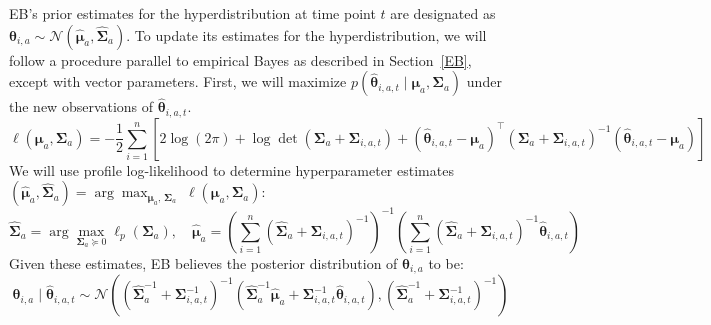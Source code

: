 \documentclass[letterpaper, 9pt]{extarticle}
\begin{document}
EB's prior estimates for the hyperdistribution at time point $t$ are designated as $\boldsymbol{\theta}_{i,a}\sim \mathcal{N}(\hat{\boldsymbol{\mu}}_a,\boldsymbol{\hat{\Sigma}}_a)$. To update its estimates for the hyperdistribution, we will follow a procedure parallel to empirical Bayes as described in Section~\ref{EB}, except with vector parameters. First, we will maximize $p(\hat{\boldsymbol{\theta}}_{i,a,t} \mid \boldsymbol{\mu}_a, \boldsymbol{\Sigma}_a)$ under the new observations of $\hat{\boldsymbol{\theta}}_{i,a,t}$.
$$\ell(\boldsymbol{\mu}_a,\boldsymbol{\Sigma}_a)
=
-\frac12
\sum_{i=1}^n
\left[
2\log(2\pi)
+
\log\det(\boldsymbol{\Sigma}_a+\boldsymbol{\Sigma}_{i,a,t})
+
(\hat{\boldsymbol{\theta}}_{i,a,t}-\boldsymbol{\mu}_a)^\top
(\boldsymbol{\Sigma}_a+\boldsymbol{\Sigma}_{i,a,t})^{-1}
(\hat{\boldsymbol{\theta}}_{i,a,t}-\boldsymbol{\mu}_a)
\right]$$
We will use profile log-likelihood to determine hyperparameter estimates
$(\hat{\boldsymbol{\mu}}_a, \hat{\boldsymbol{\Sigma}}_a)
=
\arg\max_{\boldsymbol{\mu}_a,\,\boldsymbol{\Sigma}_a}
\;\ell(\boldsymbol{\mu}_a, \boldsymbol{\Sigma}_a)$:
\[
\hat{\boldsymbol{\Sigma}}_a
=
\arg\max_{\boldsymbol{\Sigma}_a \succeq 0}
\ell_p(\boldsymbol{\Sigma}_a), \quad \hat{\boldsymbol{\mu}}_a
=
\left(
\sum_{i=1}^n
(\hat{\boldsymbol{\Sigma}}_a+\boldsymbol{\Sigma}_{i,a,t})^{-1}
\right)^{-1}
\left(
\sum_{i=1}^n
(\hat{\boldsymbol{\Sigma}}_a+\boldsymbol{\Sigma}_{i,a,t})^{-1}
\hat{\boldsymbol{\theta}}_{i,a,t}
\right)
\]
Given these estimates, EB believes the posterior distribution of $\boldsymbol{\theta}_{i,a}$ to be:
$$\boldsymbol{\theta}_{i,a}\mid \hat{\boldsymbol{\theta}}_{i,a,t}
\sim
\mathcal{N}\left(
\left(
\hat{\boldsymbol{\Sigma}}_a^{-1}
+
\boldsymbol{\Sigma}_{i,a,t}^{-1}
\right)^{-1}
\left(
\hat{\boldsymbol{\Sigma}}_a^{-1}\hat{\boldsymbol{\mu}}_a
+
\boldsymbol{\Sigma}_{i,a,t}^{-1}\hat{\boldsymbol{\theta}}_{i,a,t}
\right),
\left(
\hat{\boldsymbol{\Sigma}}_a^{-1}
+
\boldsymbol{\Sigma}_{i,a,t}^{-1}
\right)^{-1}
\right)$$
\end{document}
